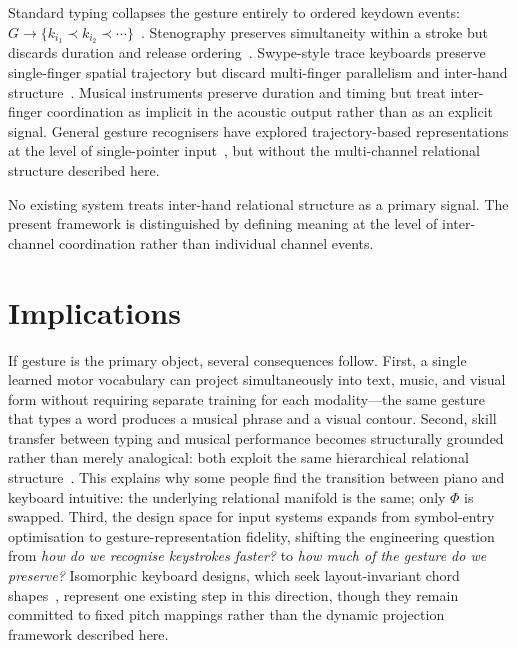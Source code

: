 \documentclass[11pt, a4paper]{article}
\begin{document}
Standard typing collapses the gesture entirely to ordered keydown
events: $G \to \{k_{i_1} \prec k_{i_2} \prec \cdots\}$~\cite{mackenzie2002}.
Stenography preserves simultaneity within a stroke but discards duration
and release ordering~\cite{plover}. Swype-style trace keyboards preserve
single-finger spatial trajectory but discard multi-finger parallelism and
inter-hand structure~\cite{zhai2012}. Musical instruments preserve
duration and timing but treat inter-finger coordination as implicit in
the acoustic output rather than as an explicit signal. General gesture
recognisers have explored trajectory-based representations at the level
of single-pointer input~\cite{wobbrock2007}, but without the
multi-channel relational structure described here.

No existing system treats inter-hand relational structure as a primary
signal. The present framework is distinguished by defining meaning at the
level of inter-channel coordination rather than individual channel events.

\section{Implications}

If gesture is the primary object, several consequences follow. First, a
single learned motor vocabulary can project simultaneously into text,
music, and visual form without requiring separate training for each
modality---the same gesture that types a word produces a musical phrase
and a visual contour. Second, skill transfer between typing and musical
performance becomes structurally grounded rather than merely analogical:
both exploit the same hierarchical relational structure~\cite{schieber2001}.
This explains why some people find the transition between piano and
keyboard intuitive: the underlying relational manifold is the same; only
$\Phi$ is swapped. Third, the design space for input systems expands from
symbol-entry optimisation to gesture-representation fidelity, shifting
the engineering question from \emph{how do we recognise keystrokes
faster?} to \emph{how much of the gesture do we preserve?} Isomorphic
keyboard designs, which seek layout-invariant chord
shapes~\cite{lumatone}, represent one existing step in this direction,
though they remain committed to fixed pitch mappings rather than the
dynamic projection framework described here.
\end{document}
